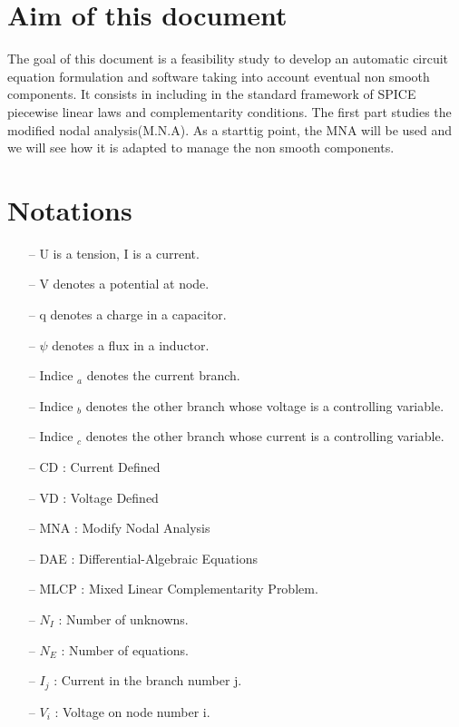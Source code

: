 
\newpage
\tableofcontents
 \newpage
 \section{Aim of this document}
 The goal of this document is a feasibility study to develop an automatic circuit equation
 formulation and software taking into account eventual non smooth components. It consists in including in the standard framework of SPICE piecewise linear laws  and complementarity conditions. The first part studies the modified nodal analysis(M.N.A). As a starttig point, the
 MNA will be used and we will see how it is adapted to manage the non smooth components.
 \section{Notations}
\begin{itemize}
  \item[--] U is a tension, I is a current.
  \item[--] V denotes a potential at node.
  \item[--] q denotes a charge in a capacitor.
  \item[--] $\psi$ denotes a flux in a inductor.
  \item[--] Indice $_{a}$ denotes the current branch.
  \item[--] Indice $_{b}$ denotes the other branch whose voltage is a controlling variable.
  \item[--] Indice $_{c}$ denotes the other branch whose current is a controlling variable.
\item[--] CD : Current Defined
\item[--] VD : Voltage Defined
\item[--] MNA : Modify Nodal Analysis
\item[--] DAE : Differential-Algebraic Equations
\item[--] MLCP : Mixed Linear Complementarity Problem.
\item[--] $N_{I}$ : Number of unknowns.
\item[--] $N_{E}$ : Number of equations.
\item[--] $I_{j}$ : Current in the branch number j.
\item[--] $V_{i}$ : Voltage on node number i. 
\end{itemize}



